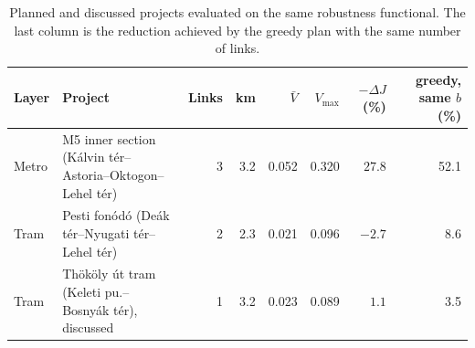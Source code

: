 \begin{table}[htbp]
\centering
\footnotesize
\begin{tabular}{l>{\raggedright\arraybackslash}p{4.6cm}rrrrrr}
\toprule
Layer & Project & Links & km & $\bar V$ & $V_{\max}$ & $-\Delta J$ (\%) & greedy, same $b$ (\%) \\
\midrule
Metro & M5 inner section (K\'alvin t\'er--Astoria--Oktogon--Lehel t\'er) & 3 & 3.2 & 0.052 & 0.320 & $27.8$ & 52.1 \\
Tram & Pesti fon\'od\'o (De\'ak t\'er--Nyugati t\'er--Lehel t\'er) & 2 & 2.3 & 0.021 & 0.096 & $-2.7$ & 8.6 \\
Tram & Th\"ok\"oly \'ut tram (Keleti pu.--Bosny\'ak t\'er), discussed & 1 & 3.2 & 0.023 & 0.089 & $1.1$ & 3.5 \\
\bottomrule
\end{tabular}
\caption{Planned and discussed projects evaluated on the same robustness functional. The last column is the reduction achieved by the greedy plan with the same number of links.}
\label{tab:aug-planned}
\par{}
\end{table}
